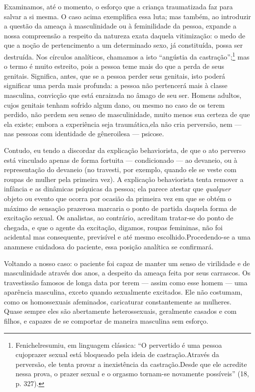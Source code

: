 Examinamos, até o momento, o esforço que a criança traumatizada faz
para salvar a si mesma. O caso acima exemplifica essa luta; mas também,
ao introduzir a questão da ameaça à masculinidade ou à feminilidade da
pessoa, expande a nossa compreensão a respeito da natureza exata
daquela vitimização: o medo de que a noção de pertencimento a um
determinado sexo, já constituída,\idxcastatrav{} possa ser destruída. Nos círculos
analíticos, chamamos a isto\idxtravemangu{} ``angústia\idxcastaiden{} da
castração'';\footnote{ Fenichel\idxfenic[|nn] resumiu, em linguagem
clássica: ``O pervertido é uma pessoa cujo\idxtravemangu[|nn] prazer sexual
está bloqueado pela ideia de castração.\idxcastaiden[|nn] Através da perversão, ele tenta
provar a inexistência da castração.\idxcastatrav[|nn] Desde que ele acredite nessa prova,
o prazer sexual e o orgasmo tornam-se novamente
possíveis'' (18, p. 327).} mas o termo é muito estreito,
pois a pessoa teme mais do que a perda de seus genitais. Significa,
antes, que se a pessoa perder seus genitais, isto poderá significar
uma perda mais profunda: a pessoa não pertencerá mais à classe
masculina, convicção que está enraizada no âmago de seu ser. Homens
adultos, cujos genitais tenham sofrido algum dano, ou mesmo no caso de
os terem perdido, não perdem seu senso de masculinidade, muito menos
sua certeza de que ela existe; embora a experiência seja traumática,\idxtravetrau[|)]
ela não cria perversão, nem --- nas pessoas com identidade de gênero\idxtraumatrav[|)]
ilesa --- psicose.

Contudo, eu tendo a discordar da explicação behaviorista, de que o
ato perverso está vinculado apenas de forma fortuita --- condicionado
--- ao devaneio, ou à representação do devaneio (no travesti, por
exemplo, quando ele se veste com roupas de mulher pela primeira vez). A
explicação behaviorista tenta remover a infância e as dinâmicas
psíquicas da pessoa; ela parece atestar que \textit{qualquer} objeto ou
evento que ocorra por ocasião da primeira vez em que se obtém o máximo
de sensação prazerosa marcaria o ponto de partida daquela forma de
excitação sexual.\idxfantaporn{} Os analistas, ao contrário, acreditam tratar-se do
ponto de chegada, e que o agente da excitação, digamos, roupas
femininas, não foi acidental mas consequente, previsível e até mesmo
escolhido.\idxcond[|)] Procedendo-se a uma anamnese cuidadosa do paciente, essa
posição analítica se confirmará.

Voltando a nosso caso: o paciente foi capaz de manter um senso de
virilidade e de masculinidade através dos anos, a despeito da ameaça
feita por seus carrascos. Os travestis\idxtravemporn[|(] são famosos de longa data por
terem --- assim como esse homem --- uma aparência masculina, exceto
quando sexualmente excitados. Ele não costumam, como os homossexuais
afeminados,\idxhomosafem{} caricaturar constantemente as mulheres. Quase sempre eles
são abertamente heterossexuais,\idxtravemhete{} geralmente casados e com filhos, e
capazes de se comportar de maneira masculina sem esforço.

